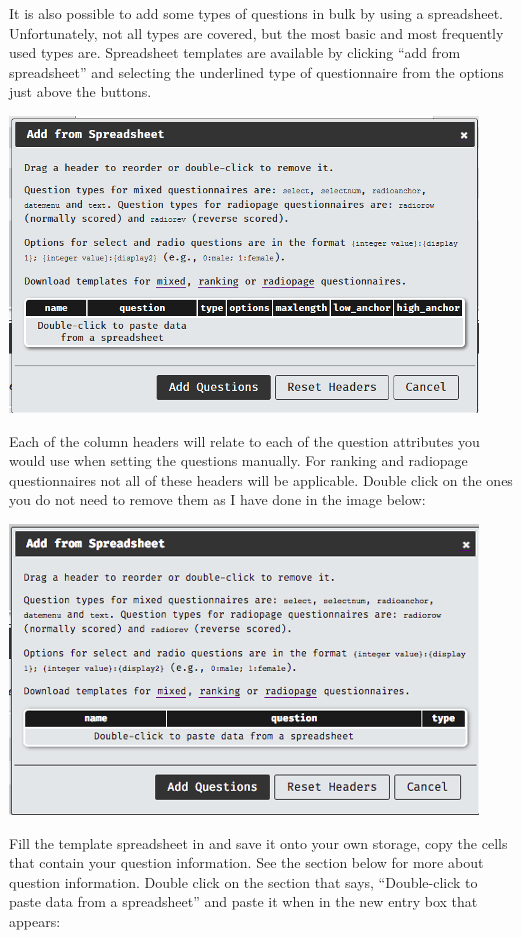 \documentclass[]{book}
\begin{document}
It is also possible to add some types of questions in bulk by using a
spreadsheet. Unfortunately, not all types are covered, but the most
basic and most frequently used types are. Spreadsheet templates are
available by clicking ``add from spreadsheet'' and selecting the
underlined type of questionnaire from the options just above the
buttons.

\includegraphics{images/screenshots/quest_spread_1.png}

Each of the column headers will relate to each of the question
attributes you would use when setting the questions manually. For
ranking and radiopage questionnaires not all of these headers will be
applicable. Double click on the ones you do not need to remove them as I
have done in the image below:

\includegraphics{images/screenshots/quest_spread_2.png}

Fill the template spreadsheet in and save it onto your own storage, copy
the cells that contain your question information. See the section below
for more about question information. Double click on the section that
says, ``Double-click to paste data from a spreadsheet'' and paste it
when in the new entry box that appears:
\end{document}

